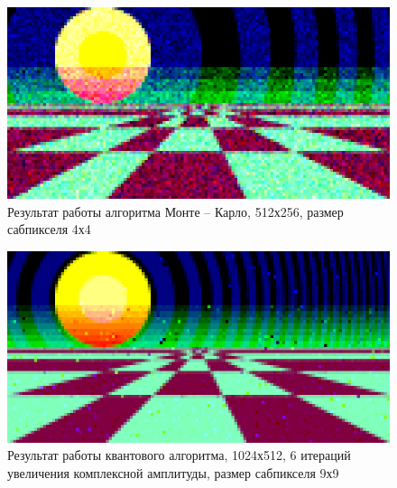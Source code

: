 \begin{figure}[H]
	\begin{center}
		\includegraphics[scale=0.96]{img/prog_res/monte-carlo-512.png}
	\end{center}
	\captionsetup{justification=centering}
	\caption{Результат работы алгоритма Монте -- Карло, 512х256, размер сабпикселя 4х4}
	\label{img:example_01-mc}
\end{figure}

\begin{figure}[H]
	\begin{center}
		\includegraphics[scale=0.48]{img/prog_res/qss-1024-6.png}
	\end{center}
	\captionsetup{justification=centering}
	\caption{Результат работы квантового алгоритма, 1024х512, 6 итераций увеличения комплексной амплитуды, размер сабпикселя 9х9}
	\label{img:example_03}
\end{figure}

